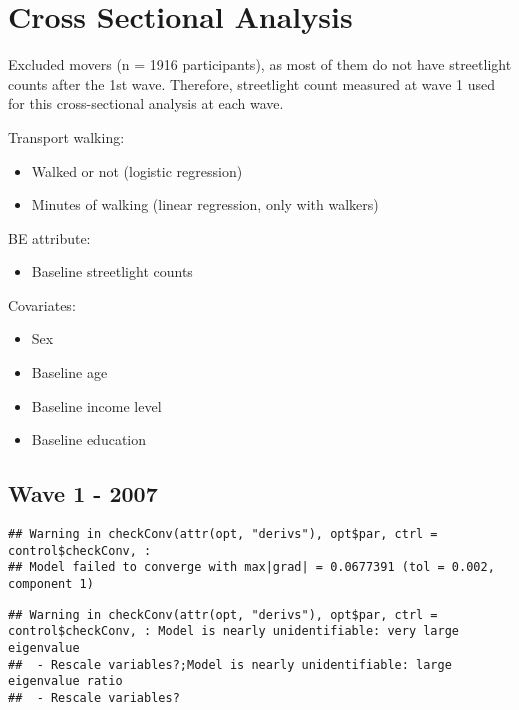 \documentclass[
]{book}
\providecommand{\tightlist}{%
  \setlength{\itemsep}{0pt}\setlength{\parskip}{0pt}}
\begin{document}
\hypertarget{cross-sectional-analysis}{%
\chapter{Cross Sectional Analysis}\label{cross-sectional-analysis}}

Excluded movers (n = 1916 participants), as most of them do not have streetlight counts after the 1st wave. Therefore, streetlight count measured at wave 1 used for this cross-sectional analysis at each wave.

Transport walking:

\begin{itemize}
\tightlist
\item
  Walked or not (logistic regression)
\item
  Minutes of walking (linear regression, only with walkers)
\end{itemize}

BE attribute:

\begin{itemize}
\tightlist
\item
  Baseline streetlight counts
\end{itemize}

Covariates:

\begin{itemize}
\tightlist
\item
  Sex
\item
  Baseline age
\item
  Baseline income level
\item
  Baseline education
\end{itemize}

\hypertarget{wave-1---2007}{%
\section{Wave 1 - 2007}\label{wave-1---2007}}

\begin{verbatim}
## Warning in checkConv(attr(opt, "derivs"), opt$par, ctrl = control$checkConv, :
## Model failed to converge with max|grad| = 0.0677391 (tol = 0.002, component 1)
\end{verbatim}

\begin{verbatim}
## Warning in checkConv(attr(opt, "derivs"), opt$par, ctrl = control$checkConv, : Model is nearly unidentifiable: very large eigenvalue
##  - Rescale variables?;Model is nearly unidentifiable: large eigenvalue ratio
##  - Rescale variables?
\end{verbatim}
\end{document}
